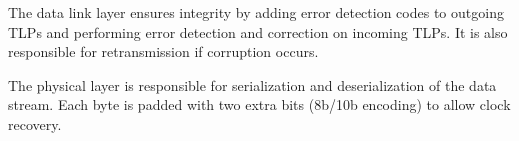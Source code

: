 The data link layer ensures integrity by adding error detection codes to outgoing TLPs and performing error detection and correction on incoming TLPs.
It is also responsible for retransmission if corruption occurs.

The physical layer is responsible for serialization and deserialization of the data stream.
Each byte is padded with two extra bits (8b/10b encoding) to allow clock recovery.

